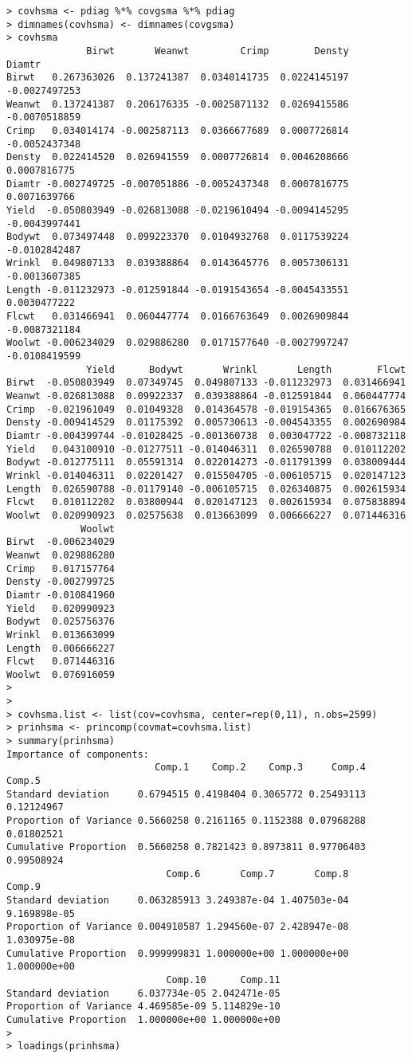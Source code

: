 \documentclass[titlepage]{article}  %
\begin{document}
\begin{verbatim}
> covhsma <- pdiag %*% covgsma %*% pdiag
> dimnames(covhsma) <- dimnames(covgsma)
> covhsma
              Birwt       Weanwt         Crimp        Densty        Diamtr
Birwt   0.267363026  0.137241387  0.0340141735  0.0224145197 -0.0027497253
Weanwt  0.137241387  0.206176335 -0.0025871132  0.0269415586 -0.0070518859
Crimp   0.034014174 -0.002587113  0.0366677689  0.0007726814 -0.0052437348
Densty  0.022414520  0.026941559  0.0007726814  0.0046208666  0.0007816775
Diamtr -0.002749725 -0.007051886 -0.0052437348  0.0007816775  0.0071639766
Yield  -0.050803949 -0.026813088 -0.0219610494 -0.0094145295 -0.0043997441
Bodywt  0.073497448  0.099223370  0.0104932768  0.0117539224 -0.0102842487
Wrinkl  0.049807133  0.039388864  0.0143645776  0.0057306131 -0.0013607385
Length -0.011232973 -0.012591844 -0.0191543654 -0.0045433551  0.0030477222
Flcwt   0.031466941  0.060447774  0.0166763649  0.0026909844 -0.0087321184
Woolwt -0.006234029  0.029886280  0.0171577640 -0.0027997247 -0.0108419599
              Yield      Bodywt       Wrinkl       Length        Flcwt
Birwt  -0.050803949  0.07349745  0.049807133 -0.011232973  0.031466941
Weanwt -0.026813088  0.09922337  0.039388864 -0.012591844  0.060447774
Crimp  -0.021961049  0.01049328  0.014364578 -0.019154365  0.016676365
Densty -0.009414529  0.01175392  0.005730613 -0.004543355  0.002690984
Diamtr -0.004399744 -0.01028425 -0.001360738  0.003047722 -0.008732118
Yield   0.043100910 -0.01277511 -0.014046311  0.026590788  0.010112202
Bodywt -0.012775111  0.05591314  0.022014273 -0.011791399  0.038009444
Wrinkl -0.014046311  0.02201427  0.015504705 -0.006105715  0.020147123
Length  0.026590788 -0.01179140 -0.006105715  0.026340875  0.002615934
Flcwt   0.010112202  0.03800944  0.020147123  0.002615934  0.075838894
Woolwt  0.020990923  0.02575638  0.013663099  0.006666227  0.071446316
             Woolwt
Birwt  -0.006234029
Weanwt  0.029886280
Crimp   0.017157764
Densty -0.002799725
Diamtr -0.010841960
Yield   0.020990923
Bodywt  0.025756376
Wrinkl  0.013663099
Length  0.006666227
Flcwt   0.071446316
Woolwt  0.076916059
> 
>
> covhsma.list <- list(cov=covhsma, center=rep(0,11), n.obs=2599)
> prinhsma <- princomp(covmat=covhsma.list)
> summary(prinhsma)
Importance of components:
                          Comp.1    Comp.2    Comp.3     Comp.4     Comp.5
Standard deviation     0.6794515 0.4198404 0.3065772 0.25493113 0.12124967
Proportion of Variance 0.5660258 0.2161165 0.1152388 0.07968288 0.01802521
Cumulative Proportion  0.5660258 0.7821423 0.8973811 0.97706403 0.99508924
                            Comp.6       Comp.7       Comp.8       Comp.9
Standard deviation     0.063285913 3.249387e-04 1.407503e-04 9.169898e-05
Proportion of Variance 0.004910587 1.294560e-07 2.428947e-08 1.030975e-08
Cumulative Proportion  0.999999831 1.000000e+00 1.000000e+00 1.000000e+00
                            Comp.10      Comp.11
Standard deviation     6.037734e-05 2.042471e-05
Proportion of Variance 4.469585e-09 5.114829e-10
Cumulative Proportion  1.000000e+00 1.000000e+00
> 
> loadings(prinhsma)


\end{verbatim}
\end{document}
